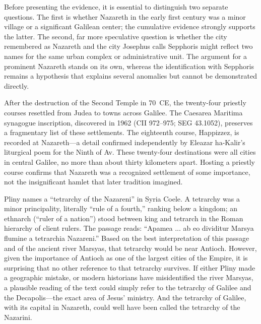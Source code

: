 Before presenting the evidence, it is essential to distinguish two separate questions.
The first is whether Nazareth in the early first century was a minor village or a significant Galilean center; the cumulative evidence strongly supports the latter.
The second, far more speculative question is whether the city remembered as Nazareth and the city Josephus calls Sepphoris might reflect two names for the same urban complex or administrative unit.
The argument for a prominent Nazareth stands on its own, whereas the identification with Sepphoris remains a hypothesis that explains several anomalies but cannot be demonstrated directly.

After the destruction of the Second Temple in 70~CE, the twenty-four priestly courses resettled from Judea to towns across Galilee.
The Caesarea Maritima synagogue inscription, discovered in 1962 (CII 972--975; SEG 43.1052), preserves a fragmentary list of these settlements.
The eighteenth course, Happizzez, is recorded at Nazareth---a detail confirmed independently by Eleazar ha-Kalir's liturgical poem for the Ninth of Av.
These twenty-four destinations were all cities in central Galilee, no more than about thirty kilometers apart.
Hosting a priestly course confirms that Nazareth was a recognized settlement of some importance, not the insignificant hamlet that later tradition imagined.

Pliny \cite[5.81]{pliny:nh} names a ``tetrarchy of the Nazareni'' in Syria Coele.
A tetrarchy was a minor principality, literally ``rule of a fourth,'' ranking below a kingdom; an ethnarch (``ruler of a nation'') stood between king and tetrarch in the Roman hierarchy of client rulers.
The passage reads:
``Apamea ... ab eo dividitur Marsya flumine a tetrarchia Nazareni.''
Based on the best interpretation of this passage and of the ancient river Marsyas, that tetrarchy would be near Antioch.
However, given the importance of Antioch as one of the largest cities of the Empire, it is surprising that no other reference to that tetrarchy survives.
If either Pliny made a geographic mistake, or modern historians have misidentified the river Marsyas, a plausible reading of the text could simply refer to the tetrarchy of Galilee and the Decapolis---the exact area of Jesus' ministry.
And the tetrarchy of Galilee, with its capital in Nazareth, could well have been called the tetrarchy of the Nazarini.

